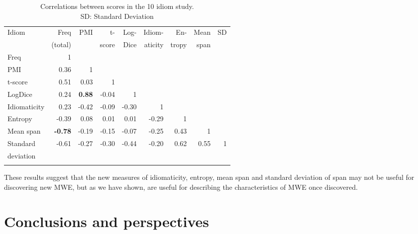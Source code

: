 \documentclass[output=paper]{langsci/langscibook}
\begin{document}
\begin{table}[ht]
\small
\begin{tabular}{p{1.8cm} r r r r r r r r} 
\lsptoprule
Idiom &
Freq  &
PMI &
t- &
Log- &
Idiom- &
En- &
Mean  &
SD \\
 &
 (total) &
 &
score
 &
Dice &
aticity &
tropy &
span &
 \\
\midrule
Freq &
1 &
~
 &
~
 &
~
 &
~
 &
~
 &
~
 &
~
\\
PMI &
0.36 &
1 &
~
 &
~
 &
~
 &
~
 &
~
 &
~
\\
t-score &
0.51 &
0.03 &
1 &
~
 &
~
 &
~
 &
~
 &
~
\\
LogDice &
0.24 &
\textbf{0.88} &
-0.04 &
1 &
~
 &
~
 &
~
 &
~
\\
Idiomaticity &
0.23 &
-0.42 &
-0.09 &
-0.30 &
1 &
~
 &
~
 &
~
\\
Entropy &
-0.39 &
0.08 &
0.01 &
0.01 &
-0.29 &
1 &
~
 &
~
\\
Mean span &
\textbf{-0.78} &
-0.19 &
-0.15 &
-0.07 &
-0.25 &
0.43 &
1 &
~
\\
Standard  &
-0.61 &
-0.27 &
-0.30 &
-0.44 &
-0.20 &
0.62 &
0.55 &
1\\
deviation & & & & & & & & \\
\lspbottomrule
\end{tabular}
\caption[Correlations between scores in the 10 idiom study.]{Correlations between scores in the 10 idiom study.\\
SD: Standard Deviation}
\label{correlations}
\end{table}




These results suggest that the new measures of idiomaticity, entropy,
mean span and standard deviation of span may not be useful for
discovering new MWE, but as we have shown, are useful for describing
the characteristics of MWE once discovered. 



\section{Conclusions and perspectives}
\end{document}
